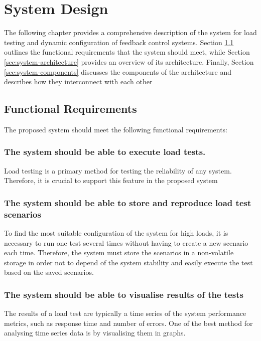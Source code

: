 \graphicspath{{figs/}} %
\chapter{System Design}
\label{ch:lr}

The following chapter provides a comprehensive description of the system for load testing and dynamic configuration of feedback control systems. Section \ref{sec:functional-requirements} outlines the functional requirements that the system should meet, while Section \ref{sec:system-architecture} provides an overview of its architecture. Finally, Section \ref{sec:system-components} discusses the components of the architecture and describes how they interconnect with each other

\section{Functional Requirements}\label{sec:functional-requirements}
The proposed system should meet the following functional requirements:
\subsection{The system should be able to execute load tests.}\label{subsec:req-execute-load-test}
Load testing is a primary method for testing the reliability of any system. Therefore, it is crucial to support this feature in the proposed system

\subsection{The system should be able to store and reproduce load test scenarios}\label{subsec:req-store-load-test}
To find the most suitable configuration of the system for high loads, it is necessary to run one test several times without having to create a new scenario each time. Therefore, the system must store the scenarios in a non-volatile storage in order not to depend of the system stability and easily execute the test based on the saved scenarios.

\subsection{The system should be able to visualise results of the tests}\label{subsec:req-visualise-load-test}
The results of a load test are typically a time series of the system performance metrics, such as response time and number of errors. One of the best method for analysing time series data is by visualising them in graphs.

